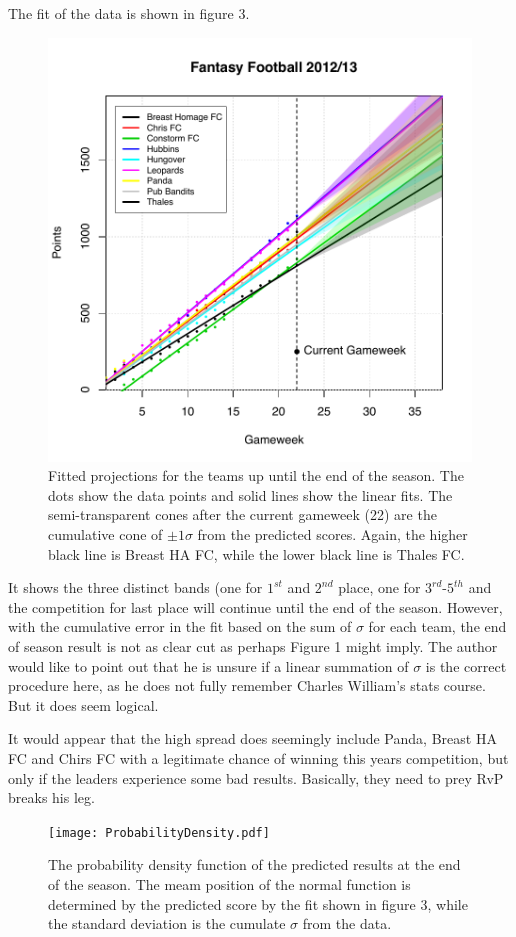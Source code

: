 \documentclass[aps,prl,twocolumn,showpacs,superscriptaddress,groupedaddress]{revtex4}  %
\begin{document}
The fit of the data is shown in figure 3.
\begin{figure}
\includegraphics[width=\linewidth]{cumGraph.pdf}
\caption{Fitted projections for the teams up until the end of the season. The dots show the data points and solid lines show the linear fits. The semi-transparent cones after the current gameweek (22) are the cumulative cone of $\pm1\sigma$ from the predicted scores. Again, the higher black line is Breast HA FC, while the lower black line is Thales FC.}
\end{figure}
It shows the three distinct bands (one for $1^{st}$ and $2^{nd}$ place, one for $3^{rd}$-$5^{th}$ and the competition for last place will continue until the end of the season. However, with the cumulative error in the fit based on the sum of $\sigma$ for each team, the end of season result is not as clear cut as perhaps Figure 1 might imply. The author would like to point out that he is unsure if a linear summation of $\sigma$ is the correct procedure here, as he does not fully remember Charles William's stats course. But it does seem logical.

It would appear that the high spread does seemingly include Panda, Breast HA FC and Chirs FC with a legitimate chance of winning this years competition, but only if the leaders experience some bad results. Basically, they need to prey RvP breaks his leg. 
\begin{figure}[h]
\texttt{[image: ProbabilityDensity.pdf]}
\caption{The probability density function of the predicted results at the end of the season. The meam position of the normal function is determined by the predicted score by the fit shown in figure 3, while the standard deviation is the cumulate $\sigma$ from the data.}
\end{figure}
\end{document}
